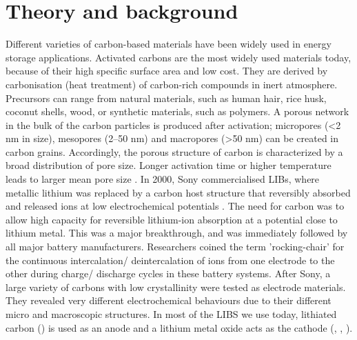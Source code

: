 \section{Theory and background}
Different varieties of carbon-based materials have been widely used in energy storage applications. Activated carbons are the most widely used
materials today, because of their high specific surface area and low cost. They are derived by carbonisation (heat treatment) of carbon-rich compounds in inert atmosphere. Precursors can range from natural materials, such as human hair, rice husk, coconut shells, wood, or synthetic materials, such as polymers. A porous network in the bulk of the carbon particles is produced after activation; micropores (<2 nm in size), mesopores (2–50 nm) and macropores (>50 nm) can be created in carbon grains. Accordingly, the porous structure of carbon is characterized by a broad distribution of pore size. Longer activation time or higher temperature leads to larger mean pore size \cite{simon_materials_2008}. In 2000, Sony commercialised LIBs, where metallic lithium was replaced by a carbon host structure that reversibly absorbed and released  ions at low electrochemical potentials \cite{ozawa}. The need for carbon was to allow high capacity for reversible lithium-ion absorption at a potential close to lithium metal. This was a major breakthrough, and was immediately followed by all major battery manufacturers. Researchers coined the term 'rocking-chair' for the  continuous intercalation/ deintercalation of ions from one electrode to the other during charge/ discharge cycles in these battery systems. After Sony, a large variety of carbons with low crystallinity were tested as electrode materials. They revealed very different electrochemical behaviours due to their different micro and macroscopic structures. In most of the LIBS we use today, lithiated carbon () is used as an anode and a lithium metal oxide acts as the cathode (, , ).   
